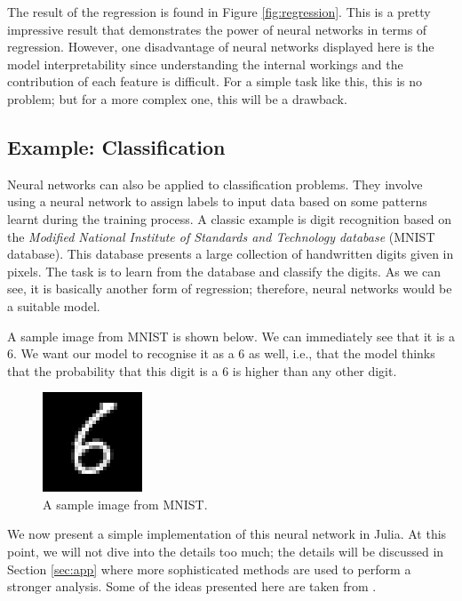 \documentclass[a4paper,11pt,titlepage]{article}
\theoremstyle{definition}
\theoremstyle{plain}
\theoremstyle{remark}
\begin{document}
The result of the regression is found in Figure \ref{fig:regression}. This is a pretty impressive result that demonstrates the power of neural networks in terms of regression. However, one disadvantage of neural networks displayed here is the model interpretability since understanding the internal workings and the contribution of each feature is difficult. For a simple task like this, this is no problem; but for a more complex one, this will be a drawback.

\subsection{Example: Classification}
\label{sec:cla}

Neural networks can also be applied to classification problems. They involve using a neural network to assign labels to input data based on some patterns learnt during the training process. A classic example is digit recognition based on the \textit{Modified National Institute of Standards and Technology database} (MNIST database). This database presents a large collection of handwritten digits given in pixels. The task is to learn from the database and classify the digits. As we can see, it is basically another form of regression; therefore, neural networks would be a suitable model.

A sample image from MNIST is shown below. We can immediately see that it is a $6$. We want our model to recognise it as a $6$ as well, i.e., that the model thinks that the probability that this digit is a $6$ is higher than any other digit.

\begin{figure}[htbp]
    \centering
    \includegraphics{report/figures/6.png}
    \caption{A sample image from MNIST.}
    \label{fig:6}
\end{figure}

We now present a simple implementation of this neural network in Julia. At this point, we will not dive into the details too much; the details will be discussed in Section \ref{sec:app} where more sophisticated methods are used to perform a stronger analysis. Some of the ideas presented here are taken from \cite{Piotr}.
\end{document}

